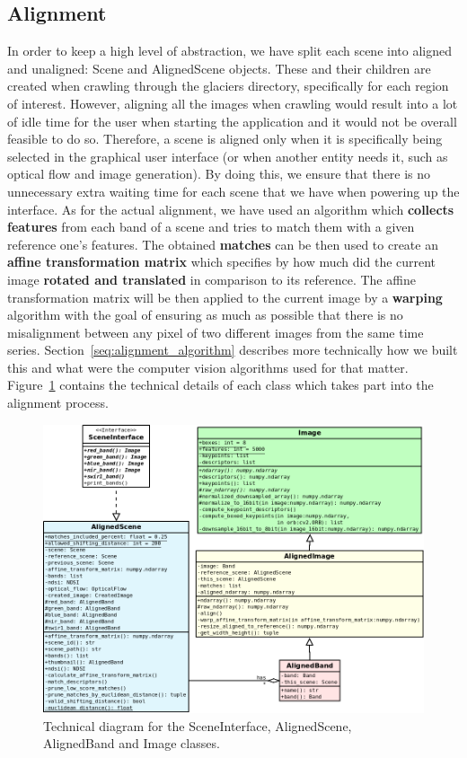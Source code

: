 \documentclass[11pt, a4paper]{report}
\begin{document}
	
	\subsection{Alignment}
	\label{seq:alignment_implementation}
	
	In order to keep a high level of abstraction, we have split each scene into aligned and unaligned: Scene and AlignedScene objects. These and their children are created when crawling through the glaciers directory, specifically for each region of interest. However, aligning all the images when crawling would result into a lot of idle time for the user when starting the application and it would not be overall feasible to do so. Therefore, a scene is aligned only when it is specifically being selected in the graphical user interface (or when another entity needs it, such as optical flow and image generation). By doing this, we ensure that there is no unnecessary extra waiting time for each scene that we have when powering up the interface.
	As for the actual alignment, we have used an algorithm which \textbf{collects features} from each band of a scene and tries to match them with a given reference one's features. The obtained \textbf{matches} can be then used to create an \textbf{affine transformation matrix} which specifies by how much did the current image \textbf{rotated and translated} in comparison to its reference. The affine transformation matrix will be then applied to the current image by a \textbf{warping} algorithm with the goal of ensuring as much as possible that there is no misalignment between any pixel of two different images from the same time series. Section~\ref{seq:alignment_algorithm} describes more technically how we built this and what were the computer vision algorithms used for that matter. Figure~\ref{fig:alignment_diagram} contains the technical details of each class which takes part into the alignment process.
	
	
	\begin{figure}[h!]
		\centering
		\includegraphics[scale=0.45]{../images/alignment_diagram.png}
		\caption{Technical diagram for the SceneInterface, AlignedScene, AlignedBand and Image classes.}
		\label{fig:alignment_diagram}
	\end{figure}
\end{document}
